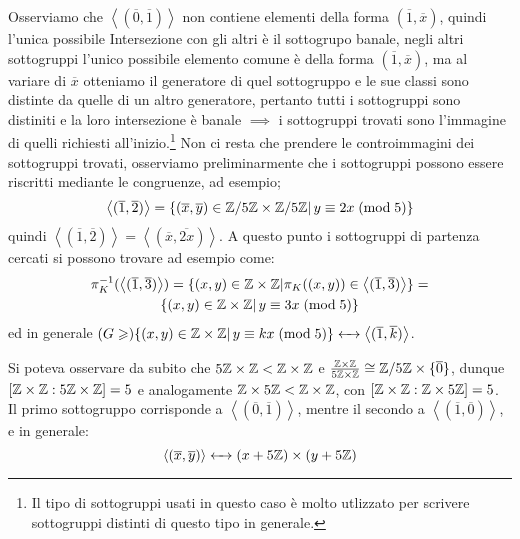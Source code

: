 \documentclass[11pt]{scrartcl}
\begin{document}
\begin{soln}
	 Osserviamo che $\left<(\overline 0, \overline 1)\right>$ non contiene elementi della forma $(\overline 1, \overline x)$, quindi l'unica possibile Intersezione con gli altri è il sottogrupo banale,
	negli altri sottogruppi l'unico possibile elemento comune è della forma $(\overline 1, \overline x)$, ma al variare di $\overline x$ otteniamo il generatore di quel sottogruppo e le sue classi sono distinte da quelle 
	di un altro generatore, pertanto tutti i sottogruppi sono distiniti e la loro intersezione è banale $\implies$ i sottogruppi trovati sono l'immagine di quelli richiesti all'inizio.\footnote{Il tipo di sottogruppi 
	usati in questo caso è molto utlizzato per scrivere sottogruppi distinti di questo tipo in generale.} Non ci resta che prendere le controimmagini dei sottogruppi trovati, osserviamo preliminarmente che i sottogruppi
	possono essere riscritti mediante le congruenze, ad esempio;
		\[ \left<(\overline 1, \overline 2)\right> = \{(\overline x, \overline y)\in \mathbb{Z}/{5}\mathbb{Z} \times \mathbb{Z}/{5}\mathbb{Z} | \, y \equiv 2x \; (\text{mod}\; 5) \}
			\]
	quindi $\left<(\overline 1, \overline 2)\right> = \left<(\overline x, \overline{2x})\right>$. A questo punto i sottogruppi di partenza cercati si possono trovare ad esempio come:
		\begin{multline*}
		\pi_K^{-1}(\left<(\overline 1, \overline 3)\right>) = \{(x,y) \in \mathbb Z \times \mathbb Z | \pi_K((x,y)) \in \left<(\overline 1, \overline 3)\right>\} = \\
		 \{(x,y) \in \mathbb Z \times \mathbb Z | \, y \equiv 3x \; (\text{mod}\; 5) \}
		\end{multline*}	
		ed in generale $(G \geqslant)\{(x,y) \in \mathbb Z \times \mathbb Z | \, y \equiv kx \; (\text{mod}\; 5)\} \leftarrow\mathrel{\mkern-7mu}\rightarrow \left<(\overline 1, \overline k)\right>$.
\end{soln}

\begin{remark}
	Si poteva osservare da subito che $5\mathbb Z \times \mathbb Z < \mathbb Z \times \mathbb Z$ e $\frac{\mathbb Z \times \mathbb Z}{5\mathbb Z \times \mathbb Z} \cong \mathbb{Z}/{5}\mathbb{Z} \times \{\overline 0\}$, dunque 
	$[\mathbb Z \times \mathbb Z : 5\mathbb Z \times \mathbb Z] = 5$ e analogamente $\mathbb Z \times 5\mathbb Z < \mathbb Z \times \mathbb Z$, con $[\mathbb Z \times \mathbb Z : \mathbb Z \times 5\mathbb Z] = 5$. Il primo sottogruppo corrisponde
	a $\left<(\overline 0, \overline 1)\right>$, mentre il secondo a $\left<(\overline 1, \overline 0)\right>$, e in generale:
		\[ \left<(\overline x, \overline y)\right> \leftarrow\mathrel{\mkern-7mu}\rightarrow (x + 5\mathbb Z) \times (y + 5\mathbb Z)
			\]
\end{remark}
\end{document}
